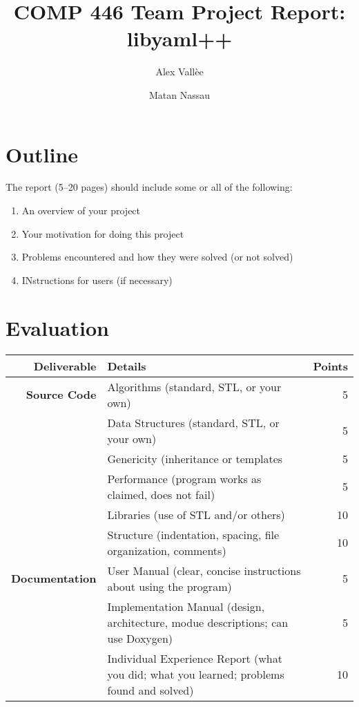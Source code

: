 \documentclass{article}
\author{Alex Vall\`ee \and Matan Nassau}
\title{COMP 446 Team Project Report:  libyaml++}
\begin{document}
\maketitle

\section{Outline}
The report (5--20 pages) should include some or all of the following:

\begin{enumerate}
  \item An overview of your project
  \item Your motivation for doing this project
  \item Problems encountered and how they were solved (or not solved)
  \item INstructions for users (if necessary)
\end{enumerate}

\section{Evaluation}
\vspace{2em}

\begin{tabular}{rp{40ex}r}
  \hline
  \textbf{Deliverable} & \textbf{Details} & \textbf{Points} \\
  \hline
  \textbf{Source Code} & Algorithms (standard, STL, or your own) & 5 \\
  & Data Structures (standard, STL, or your own) & 5 \\
  & Genericity (inheritance or templates & 5 \\
  & Performance (program works as claimed, does not fail) & 5 \\
  & Libraries (use of STL and/or others) & 10 \\
  & Structure (indentation, spacing, file organization, comments) & 10 \\
  \textbf{Documentation} & User Manual (clear, concise instructions about using the program) & 5 \\
  & Implementation Manual (design, architecture, modue descriptions; can use Doxygen) & 5 \\
  & Individual Experience Report (what you did; what you learned; problems found and solved) & 10 \\
  \hline
\end{tabular}
\end{document}

